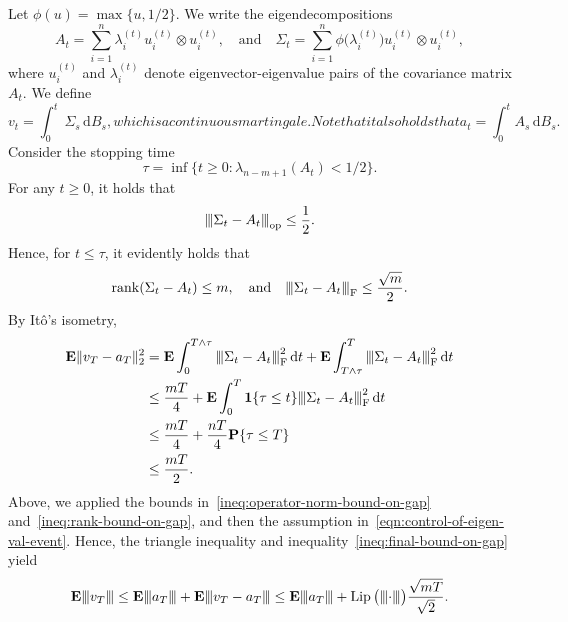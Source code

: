 \documentclass[11pt]{amsart}
\newcommand{\E}{\mathbf E}
\newcommand{\Prob}{\mathbf P}
\newcommand{\Lip}{\operatorname{Lip}}
\newcommand{\rank}{\operatorname{rank}}
\newcommand{\1}{\mathbf 1}
\newcommand{\vertiii}[1]{{\left\vert\kern-0.25ex\left\vert\kern-0.25ex\left\vert #1 
\right\vert\kern-0.25ex\right\vert\kern-0.25ex\right\vert}}
\newcommand{\gauge}[1]{\vertiii{#1}}
\newcommand{\opnorm}[1]{\vertiii{#1}_{\rm op}}
\newcommand{\fronorm}[1]{\vertiii{#1}_{\rm F}}
\newcommand{\ud}{\mathrm{d}}
\theoremstyle{plain}
\begin{document}
Let $\phi(u) = \max\{u, 1/2\}$. We write the eigendecompositions 
\[
A_t = \sum_{i=1}^n \lambda_i^{(t)} u_i^{(t)} \otimes u_i^{(t)}, \quad \mbox{and} \quad 
\Sigma_t 
= \sum_{i=1}^n \phi\big(\lambda_i^{(t)}\big) u_i^{(t)} \otimes u_i^{(t)},
\]
where $u_i^{(t)}$ and $\lambda_i^{(t)}$ denote eigenvector-eigenvalue pairs of the covariance matrix $A_t$.
We define 
\begin{subequations}
\begin{equation}
\label{eqn:martingale-truncated}    
v_t = \int_0^t \, \Sigma_s \, \ud B_s,
\end{equation}
which is a continuous martingale. Note that 
it also holds that 
\begin{equation}
\label{eqn:martingale-not-truncated}    
a_t = \int_0^t A_s \, \ud B_s.
\end{equation}
\end{subequations}
Consider the stopping time 
\[
\tau = \inf\{t \geq 0 : \lambda_{n - m + 1}(A_t) < 1/2 \}. 
\]
For any $t \geq 0$, it holds that
\begin{equation}
\label{ineq:operator-norm-bound-on-gap}
\opnorm{\Sigma_t - A_t} \leq \frac{1}{2}.
\end{equation}
Hence, for $t \leq \tau$, it evidently holds that 
\begin{equation}
\label{ineq:rank-bound-on-gap}
\rank(\Sigma_t - A_t) \leq m, 
\quad \mbox{and} \quad
\fronorm{\Sigma_t - A_t} \leq \frac{\sqrt{m}}{2}.
\end{equation}
By It\^o's isometry,
\begin{align}
\E \|v_T - a_T\|_2^2 &= 
\E \int_0^{T \wedge \tau} \fronorm{\Sigma_t - A_t}^2 
\, \ud t + 
\E \int_{T \wedge \tau}^T\fronorm{\Sigma_t - A_t}^2 \, \ud t \nonumber \\ 
&\leq \frac{m T}{4} + \E \int_0^T \1\{\tau \leq t\} \fronorm{\Sigma_t - A_t}^2 \, \ud t 
\nonumber  \\ 
&\leq \frac{mT}{4} + 
\frac{n T}{4} \Prob\{\tau \leq T\} 
\nonumber \\ 
&\leq \frac{m T}{2}.
\label{ineq:final-bound-on-gap}
\end{align}
Above, we applied
the bounds in~\eqref{ineq:operator-norm-bound-on-gap}
and~\eqref{ineq:rank-bound-on-gap}, and then the assumption
in~\eqref{eqn:control-of-eigen-val-event}.
Hence, the triangle inequality and inequality~\eqref{ineq:final-bound-on-gap} yield
\begin{equation}
\label{ineq:bound-on-v-t}
\E \gauge{v_T}\leq \E \gauge{a_T} + \E \gauge{v_T -a_T} 
\leq \E \gauge{a_T} + \Lip\big(\gauge{\cdot} \big)\frac{\sqrt{m T}}{\sqrt{2}}.
\end{equation}
\end{document}
